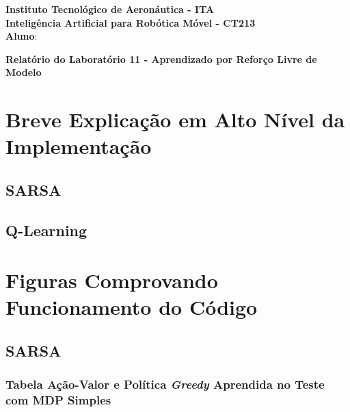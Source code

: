 \documentclass[brazil, 12pt]{article}
\begin{document}
\begin{center}
\textbf{Instituto Tecnológico de Aeronáutica - ITA} \\
\textbf{Inteligência Artificial para Robótica Móvel - CT213} \\
\textbf{Aluno}:     %
\end{center}

\begin{center}
\textbf{Relatório do Laboratório 11 - Aprendizado por Reforço Livre de Modelo}
\end{center}
\vspace*{0.5cm}

\section{Breve Explicação em Alto Nível da Implementação}

\subsection{SARSA}

\subsection{Q-Learning}



\section{Figuras Comprovando Funcionamento do Código}

\subsection{SARSA}

\subsubsection{Tabela Ação-Valor e Política \emph{Greedy} Aprendida no Teste com MDP Simples}
\end{document}
